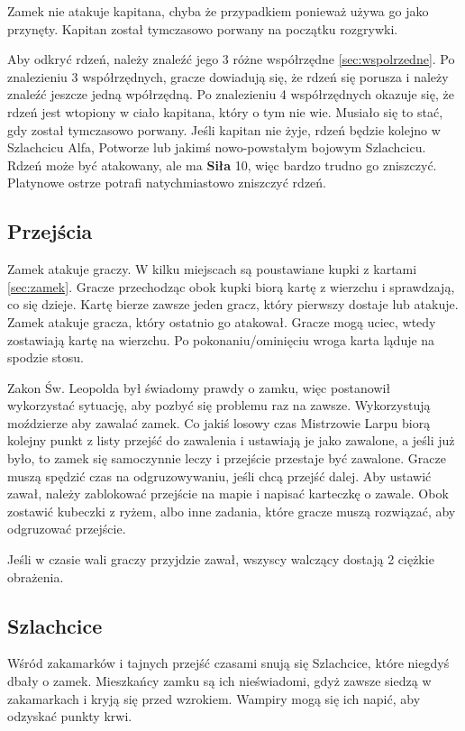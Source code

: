 		Zamek nie atakuje kapitana, chyba że przypadkiem ponieważ używa go jako przynęty.
		Kapitan został tymczasowo porwany na początku rozgrywki.
		
		Aby odkryć rdzeń, należy znaleźć jego 3 różne współrzędne \ref{sec:wspolrzedne}.
		Po znalezieniu 3 współrzędnych, gracze dowiadują się, że rdzeń się porusza i należy znaleźć jeszcze jedną wpółrzędną.
		Po znalezieniu 4 współrzędnych okazuje się, że rdzeń jest wtopiony w ciało kapitana, który o tym nie wie.
		Musiało się to stać, gdy został tymczasowo porwany.
		Jeśli kapitan nie żyje, rdzeń będzie kolejno w Szlachcicu Alfa, Potworze lub jakimś nowo-powstałym bojowym Szlachcicu.
		Rdzeń może być atakowany, ale ma \textbf{Siła} 10, więc bardzo trudno go zniszczyć.
		Platynowe ostrze potrafi natychmiastowo zniszczyć rdzeń.
		
	\subsection{Przejścia}
		Zamek atakuje graczy.
		W kilku miejscach są poustawiane kupki z kartami \ref{sec:zamek}.
		Gracze przechodząc obok kupki biorą kartę z wierzchu i sprawdzają, co się dzieje.
		Kartę bierze zawsze jeden gracz, który pierwszy dostaje lub atakuje.
		Zamek atakuje gracza, który ostatnio go atakował.
		Gracze mogą uciec, wtedy zostawiają kartę na wierzchu.
		Po pokonaniu/ominięciu wroga karta ląduje na spodzie stosu.
		
		Zakon Św. Leopolda był świadomy prawdy o zamku, więc postanowił wykorzystać sytuację, aby pozbyć się problemu raz na zawsze.
		Wykorzystują moździerze aby zawalać zamek.
		Co jakiś losowy czas Mistrzowie Larpu biorą kolejny punkt z listy przejść do zawalenia i ustawiają je jako zawalone, a jeśli już było, to zamek się samoczynnie leczy i przejście przestaje być zawalone.
		Gracze muszą spędzić czas na odgruzowywaniu, jeśli chcą przejść dalej.
		Aby ustawić zawał, należy zablokować przejście na mapie i napisać karteczkę o zawale.
		Obok zostawić kubeczki z ryżem, albo inne zadania, które gracze muszą rozwiązać, aby odgruzować przejście.
		
		Jeśli w czasie wali graczy przyjdzie zawał, wszyscy walczący dostają 2 ciężkie obrażenia.

	\subsection{Szlachcice}
		Wśród zakamarków i tajnych przejść czasami snują się Szlachcice, które niegdyś dbały o zamek.
		Mieszkańcy zamku są ich nieświadomi, gdyż zawsze siedzą w zakamarkach i kryją się przed wzrokiem.
		Wampiry mogą się ich napić, aby odzyskać punkty krwi.
		
